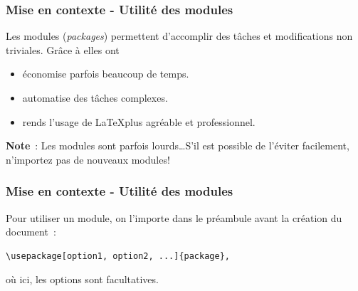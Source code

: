 
\begin{frame}
    \frametitle{Mise en contexte - Utilité des modules}
    Les modules (\textit{packages}) permettent d'accomplir
    des tâches et modifications non triviales. Grâce à elles ont
    \vspace{0.3cm}
    \begin{itemize}
        \pause
        \item[$\diamond$] économise parfois beaucoup de temps.
        \item[$\diamond$] automatise des tâches complexes.
        \item[$\diamond$] rends l'usage de \LaTeX\;plus agréable et professionnel.
    \end{itemize}
    \vfill
    \pause
    \begin{mybrownbox}
        \textbf{Note}~: Les modules sont parfois lourds\dots\;S'il est possible de l'éviter
        facilement, n'importez pas de nouveaux modules!
    \end{mybrownbox}
\end{frame}

\begin{frame}[fragile]
    \frametitle{Mise en contexte - Utilité des modules}
    Pour utiliser un module, on l'importe dans le préambule \textcolor{vibrant_green}{avant la création du
    document}~:
    \vfill
    \begin{lstlisting}[xleftmargin=-10mm]
        \usepackage[option1, option2, ...]{package},
    \end{lstlisting}
    \vfill
    où ici, les options sont facultatives.
\end{frame}
